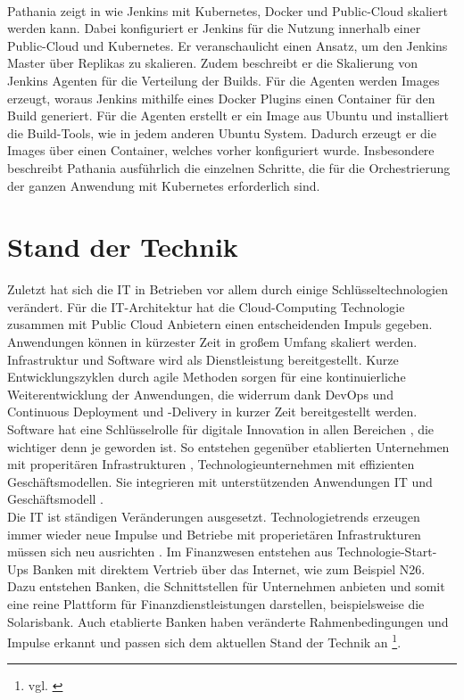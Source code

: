 \medskip
\\
Pathania zeigt in \cite{Pathania2017} wie Jenkins mit Kubernetes, Docker und Public-Cloud skaliert werden kann. Dabei konfiguriert er Jenkins für die Nutzung innerhalb einer Public-Cloud und Kubernetes. Er veranschaulicht einen Ansatz, um den Jenkins Master über Replikas zu skalieren. Zudem beschreibt er die Skalierung von Jenkins Agenten für die Verteilung der Builds. Für die Agenten werden Images erzeugt, woraus Jenkins mithilfe eines Docker Plugins einen Container für den Build generiert. Für die Agenten erstellt er ein Image aus Ubuntu und installiert die Build-Tools, wie in jedem anderen Ubuntu System.
Dadurch erzeugt er die Images über einen Container, welches vorher konfiguriert wurde. Insbesondere beschreibt Pathania ausführlich die einzelnen Schritte, die für die Orchestrierung der ganzen Anwendung mit Kubernetes erforderlich sind.

\section{Stand der Technik}

Zuletzt hat sich die IT in Betrieben vor allem durch einige Schlüsseltechnologien verändert. Für die IT-Architektur hat die Cloud-Computing Technologie zusammen mit Public Cloud Anbietern einen entscheidenden Impuls gegeben. Anwendungen können in kürzester Zeit in großem Umfang skaliert werden. Infrastruktur und Software wird als Dienstleistung bereitgestellt. Kurze Entwicklungszyklen durch agile Methoden sorgen für eine kontinuierliche Weiterentwicklung der Anwendungen, die widerrum dank DevOps und Continuous Deployment und -Delivery in kurzer Zeit bereitgestellt werden.
\medskip
\\
Software hat eine Schlüsselrolle für digitale Innovation in allen Bereichen \cite{Alt2017}, die wichtiger denn je geworden ist. So entstehen gegenüber etablierten Unternehmen mit properitären Infrastrukturen \cite{Bussmann2006}, Technologieunternehmen mit effizienten Geschäftsmodellen. Sie integrieren mit unterstützenden Anwendungen IT und Geschäftsmodell \cite{Bussmann2006}. 
\medskip
\\
Die IT ist ständigen Veränderungen ausgesetzt. Technologietrends erzeugen immer wieder neue Impulse und Betriebe mit properietären Infrastrukturen müssen sich neu ausrichten \cite{Bussmann2006}. Im Finanzwesen entstehen aus Technologie-Start-Ups Banken mit direktem Vertrieb über das Internet, wie zum Beispiel N26. Dazu entstehen Banken, die Schnittstellen für Unternehmen anbieten und somit eine reine Plattform für Finanzdienstleistungen darstellen, beispielsweise die Solarisbank. Auch etablierte Banken haben veränderte Rahmenbedingungen und Impulse erkannt und passen sich dem aktuellen Stand der Technik an \footnote{vgl. \cite{Gupta:2017}}.

